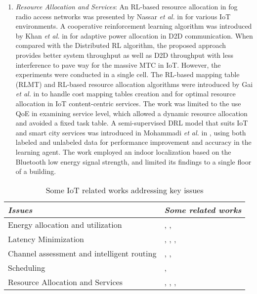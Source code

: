 \documentclass[journal]{IEEEtran}
\begin{document}
\begin{enumerate}[leftmargin=*,label= \arabic*)]
      \item \textit{Resource Allocation and Services}: An RL-based resource allocation in fog radio access networks was presented by Nassar \emph{et al.} in \cite{Nassar} for various IoT environments. A cooperative reinforcement learning algorithm was introduced by Khan \emph{et al.} in \cite{Khan2018} for adaptive power allocation in D2D communication. When compared with the Distributed RL algorithm, the proposed approach provides better system throughput as well as D2D throughput with less interference to pave way for the massive MTC in IoT. However, the experiments were conducted in a single cell. The RL-based mapping table (RLMT) and RL-based resource allocation algorithms were introduced  by Gai \emph{et al.} in \cite{Gai2018} to handle cost mapping tables creation and for optimal resource allocation in IoT content-centric services. The work was limited to the use QoE in examining service level, which allowed a dynamic resource allocation and avoided a fixed task table. A semi-supervised DRL model that suits IoT and smart city services was introduced in Mohammadi \emph{et al.} in \cite{Mohammadi2018}, using both labeled and unlabeled data for performance improvement and accuracy in the learning agent. The work employed an indoor localization based on the Bluetooth low energy signal strength, and limited its findings to a single floor of a building.



    \end{enumerate}


\begin{table}
\small
\centering
\caption{Some IoT related works addressing key issues}
\label{table:refissues}
\begin{tabular}{ll}
  \hline
 \textit{Issues} & \textit{Some related works} \\
  \hline \hline
   Energy allocation and utilization & \cite{Zhong2018}, \cite{Conti2017}, \cite{Debizet2018}\\
   Latency Minimization & \cite{Mai2018}, \cite{Li2014}, \cite{Liu2017}, \cite{routray2017}\\
   Channel assessment and intelligent routing  & \cite{Jadoon2017}, \cite{Camelo2016}, \cite{Li2015} \\
   Scheduling & \cite{Wen15}, \cite{Zhu2018}\\
   Resource Allocation and Services & \cite{Nassar}, \cite{Khan2018}, \cite{Gai2018}, \cite{Mohammadi2018}\\

      \hline \hline
 \end{tabular}
 \end{table}
\end{document}
